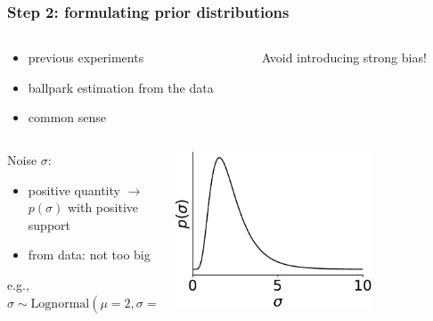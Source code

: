 \documentclass[t,aspectratio=169]{beamer}
\begin{document}
\begin{frame}
  \frametitle{Step 2: formulating prior distributions}
  \begin{columns}
    \begin{column}[T]{0.55\textwidth}
      \begin{tcolorbox}[title=Incorporate all available information]
        \begin{itemize}
        \item previous experiments
        \item ballpark  estimation from the data
        \item common sense
        \end{itemize}
      \end{tcolorbox}
    \end{column}
    \begin{column}[T]{0.4\textwidth}
      \begin{tcolorbox}[fontupper=\small,title=\textcolor{red}{Warning}]
        Avoid introducing strong bias!
      \end{tcolorbox}
    \end{column}
  \end{columns}
  \vfill
  \begin{columns}
    \begin{column}{0.65\textwidth}
      Noise $\sigma$:\\
      \begin{itemize}
      \item positive quantity $\rightarrow$ $p(\sigma)$ with positive support
      \item from data: not too big
      \end{itemize}
      e.g., $\sigma \sim \mathrm{Lognormal}(\mu=2, \sigma=\frac{1}{2})$\\
    \end{column}
    \begin{column}[T]{0.3\textwidth}
      \includegraphics[width=0.7\textwidth]{images/lognormal-crop}

\end{column}
\end{columns}
\end{frame}
\end{document}
